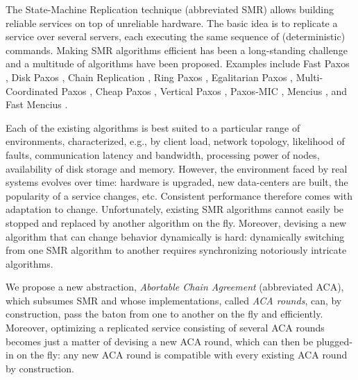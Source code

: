 The State-Machine Replication technique (abbreviated SMR) allows
building reliable services on top of unreliable hardware. The basic idea is to 
replicate a service over several servers, each executing the same
sequence of (deterministic) commands. 
Making SMR algorithms efficient has been a long-standing
challenge and a multitude of algorithms have been proposed. Examples
include Fast Paxos \cite{Lamport06FastPaxos}, Disk Paxos
\cite{GafniLamport03DiskPaxos}, Chain Replication
\cite{RenesseSchneider04ChainReplicationSupportingHighThroughputAvailability},
Ring Paxos
\cite{MarandiETAL10RingPaxosHighthroughputAtomicBroadcastProtocol},
Egalitarian Paxos
\cite{MoraruAndersenKaminsky13ThereIsMoreConsensusEgalitarianParliaments},
Multi-Coordinated Paxos
\cite{CamargosSchmidtPedone07MulticoordinatedPaxos}, Cheap Paxos
\cite{LamportMassa04CheapPaxos}, Vertical Paxos
\cite{LamportMalkhiZhou09VerticalPaxosPrimarybackupReplication},
Paxos-MIC
\cite{HurfinMoiseNarzul11AdaptiveFastPaxosMakingQuickEverlasting},
Mencius
\cite{MaoJunqueiraMarzullo08MenciusBuildingEfficientReplicatedStateMachine},
and Fast Mencius \cite{WeiETAL13FastMenciusMenciusLowCommitLatency}.

Each of the existing algorithms is best suited to a particular range
of environments, characterized, e.g., by client load, network
topology, likelihood of faults, communication latency and bandwidth, processing
power of nodes, availability of disk storage and memory.
However, the environment faced by real systems evolves over time:
hardware is upgraded, new data-centers are built, the popularity of a
service changes, etc.  Consistent performance therefore comes with
adaptation to change.  Unfortunately, existing SMR algorithms cannot easily be
stopped and replaced by another algorithm on the fly. Moreover,
devising a new algorithm that can change behavior dynamically is hard:
dynamically switching from one SMR algorithm to another requires
synchronizing notoriously intricate algorithms.

We propose a new abstraction, \emph{Abortable Chain Agreement}
(abbreviated ACA), which subsumes SMR and whose implementations,
called \emph{ACA rounds}, can, by construction, pass the baton from
one to another on the fly and efficiently. Moreover, optimizing a replicated
service consisting of several ACA rounds becomes just a matter of devising a new
ACA round, which can then be plugged-in on the fly: any new ACA round
is compatible with every existing ACA round by construction.


